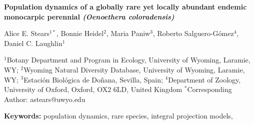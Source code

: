 \documentclass[12pt, letterpaper]{article}
\begin{document}
\begin{flushleft}
\textbf{Population dynamics of a globally rare yet locally abundant endemic monocarpic perennial \textit{(Oenoethera coloradensis)}}

\normalsize{Alice E. Stears$^{1*}$, Bonnie Heidel$^2$, Maria Paniw$^3$, Roberto Salguero-Gómez$^4$, Daniel C. Laughlin$^1$}

\small{$^1$Botany Department and Program in Ecology, University of Wyoming, Laramie, WY; \linebreak
$^2$Wyoming Natural Diversity Database, University of Wyoming, Laramie, WY; \linebreak
$^3$Estación Biológica de Doñana, Sevilla, Spain; \linebreak
$^4$Department of Zoology, University of Oxford, Oxford, OX2 6LD, United Kingdom}\linebreak
\small{$^*$Corresponding Author: astears@uwyo.edu}


\end{flushleft}
\textbf{Keywords:} population dynamics, rare species, integral projection models, 
\end{document}
